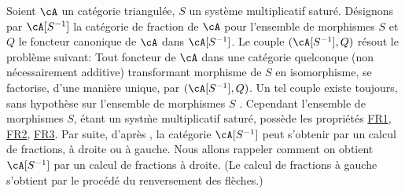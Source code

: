 Soient $\cA$ un cat\'egorie triangul\'ee, $S$ un syst\`eme multiplicatif 
satur\'e. D\'esignons par $\cA[S^{-1}]$ la cat\'egorie de fraction de $\cA$ 
pour l'ensemble de morphismes $S$ et $Q$ le foncteur canonique de $\cA$ dans 
$\cA[S^{-1}]$. Le couple $(\cA[S^{-1}],Q)$ r\'esout le probl\`eme suivant: Tout 
foncteur de $\cA$ dans une cat\'egorie quelconque (non n\'ecessairement 
additive) transformant morphisme de $S$ en isomorphisme, se factorise, d'une 
mani\`ere unique, par $(\cA[S^{-1}],Q)$. Un tel couple existe toujours, sans 
hypoth\`ese sur l'ensemble de morphismes $S$ \cite{cgg}. Cependant l'ensemble 
de morphismes $S$, \'etant un syst\`me multiplicatif satur\'e, poss\`ede les 
propri\'et\'es \hyperlink{VIII:FR1}{FR1}, \hyperlink{VIII:FR2}{FR2}, 
\hyperlink{VIII:FR3}{FR3}. Par suite, d'apr\`es \cite{cgg}, la cat\'egorie 
$\cA[S^{-1}]$ peut s'obtenir par un calcul de fractions, \`a droite ou \`a 
gauche. Nous allons rappeler comment on obtient $\cA[S^{-1}]$ par un calcul de 
fractions \`a droite. (Le calcul de fractions \`a gauche s'obtient par le 
proc\'ed\'e du renversement des fl\`eches.) 





\subsubsection{}\label{VIII:2-3-2}

